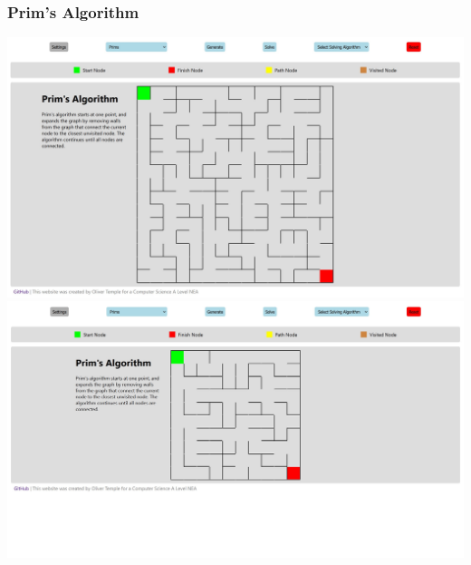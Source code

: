 \documentclass{article}
\begin{document}
\subsubsection{Prim's Algorithm}
\includegraphics[width=\linewidth]{assets/testing/test3a.jpg}
\includegraphics[width=\linewidth]{assets/testing/test3b.jpg}
\end{document}
